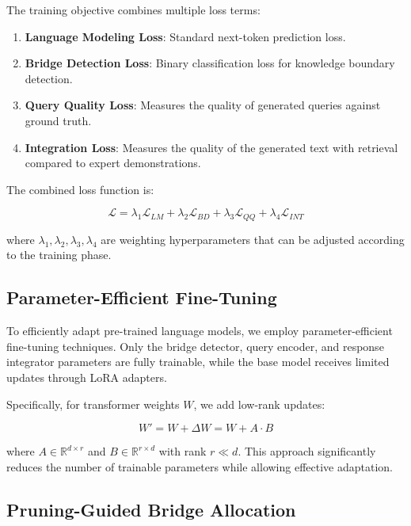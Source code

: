 \documentclass[9pt,a4paper,twocolumn,twoside]{tau-class/tau}
\begin{document}
    The training objective combines multiple loss terms:

    \begin{enumerate}
        \item \textbf{Language Modeling Loss}: Standard next-token prediction loss.
        \item \textbf{Bridge Detection Loss}: Binary classification loss for knowledge boundary detection.
        \item \textbf{Query Quality Loss}: Measures the quality of generated queries against ground truth.
        \item \textbf{Integration Loss}: Measures the quality of the generated text with retrieval compared to expert demonstrations.
    \end{enumerate}

    The combined loss function is:

    \begin{equation}
    \mathcal{L} = \lambda_1 \mathcal{L}_{LM} + \lambda_2 \mathcal{L}_{BD} + \lambda_3 \mathcal{L}_{QQ} + \lambda_4 \mathcal{L}_{INT}
    \end{equation}

    where $\lambda_1, \lambda_2, \lambda_3, \lambda_4$ are weighting hyperparameters that can be adjusted according to the training phase.

\subsection{Parameter-Efficient Fine-Tuning}

    To efficiently adapt pre-trained language models, we employ parameter-efficient fine-tuning techniques. Only the bridge detector, query encoder, and response integrator parameters are fully trainable, while the base model receives limited updates through LoRA adapters.

    Specifically, for transformer weights $W$, we add low-rank updates:

    \begin{equation}
    W' = W + \Delta W = W + A \cdot B
    \end{equation}

    where $A \in \mathbb{R}^{d \times r}$ and $B \in \mathbb{R}^{r \times d}$ with rank $r \ll d$. This approach significantly reduces the number of trainable parameters while allowing effective adaptation.

\subsection{Pruning-Guided Bridge Allocation}
\end{document}
